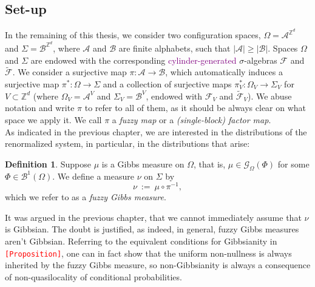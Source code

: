 \documentclass[12pt]{article}
\newcommand{\A}{\mathcal{A}}
\newcommand{\B}{\mathcal{B}}
\newcommand{\BB}{\mathscr{B}}
\newcommand{\F}{\mathcal{F}}
\newcommand{\G}{\mathcal{G}}
\newcommand{\Z}{\mathbb{Z}}
\newcommand{\ra}{\rightarrow}
\newcommand{\1}{\mathbbm{1}}
\newcommand{\5}{\vspace{0.5cm}}
\renewcommand{\tilde}{\widetilde}
\theoremstyle{definition}
\newtheorem{df}[thm]{Definition}
\begin{document}

\subsection{Set-up}

In the remaining of this thesis, we consider two configuration spaces, $\Omega=\A^{\Z^d}$ and $\Sigma=\B^{\Z^d}$, where $\A$ and $\B$ are finite alphabets, such that $|\A|\geq|\B|$. Spaces $\Omega$ and $\Sigma$ are endowed with the corresponding \textcolor{purple}{cylinder-generated} $\sigma$-algebras $\F$ and $\tilde{\F}$. We consider a surjective map $\pi:\A\ra\B$, which automatically induces a surjective map $\pi^*:\Omega\ra\Sigma$ and a collection of surjective maps $\pi_V^*:\Omega_V\ra\Sigma_V$ for $V\subset\Z^d$ (where $\Omega_V=\A^V$ and $\Sigma_V=\B^V$, endowed with $\F_V$ and $\tilde{\F}_V$). We abuse notation and write $\pi$ to refer to all of them, as it should be always clear on what space we apply it. We call $\pi$ a \textit{fuzzy map} or a \textit{(single-block) factor map}.  \\

As indicated in the previous chapter, we are interested in the distributions of the renormalized system, in particular, in the distributions that arise:
\begin{df}
Suppose $\mu$ is a Gibbs measure on $\Omega$, that is, $\mu\in\G_\Omega(\Phi)$ for some $\Phi\in\BB^1(\Omega)$. We define a measure $\nu$ on $\Sigma$ by
$$\nu ~:=~ \mu \circ \pi^{-1},$$
which we refer to as a \textit{fuzzy Gibbs measure}.
\end{df}
It was argued in the previous chapter, that we cannot immediately assume that $\nu$ is Gibbsian. The doubt is justified, as indeed, in general, fuzzy Gibbs measures aren't Gibbsian. Referring to the equivalent conditions for Gibbsianity in \textcolor{red}{\texttt{[Proposition]}}, one can in fact show that the uniform non-nullness is always inherited by the fuzzy Gibbs measure, so non-Gibbsianity is always a consequence of non-quasilocality of conditional probabilities. \\
\end{document}
